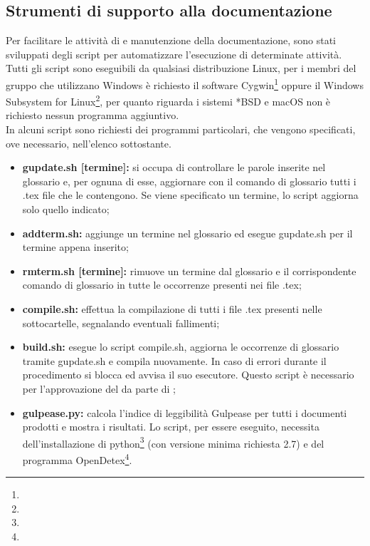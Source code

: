 \documentclass[NormeDiProgetto.tex]{subfiles}
\begin{document}
	\subsection{Strumenti di supporto alla documentazione}
	Per facilitare le attività di  e manutenzione della documentazione, sono stati sviluppati degli script per automatizzare l'esecuzione di determinate attività. \\
	Tutti gli script sono eseguibili da qualsiasi distribuzione Linux, per i membri del gruppo che utilizzano Windows è richiesto il software Cygwin\footnote{} oppure il Windows Subsystem for Linux\footnote{}, per quanto riguarda i sistemi *BSD e macOS non è richiesto nessun programma aggiuntivo.\\
	In alcuni script sono richiesti dei programmi particolari, che vengono specificati, ove necessario, nell'elenco sottostante.
	\begin{itemize}
		\item \textbf{gupdate.sh [termine]:} si occupa di controllare le parole inserite nel glossario e, per ognuna di esse, aggiornare con il comando di glossario tutti i .tex file che le contengono. Se viene specificato un termine, lo script aggiorna solo quello indicato;
		\item \textbf{addterm.sh:} aggiunge un termine nel glossario ed esegue gupdate.sh per il termine appena inserito;
		\item \textbf{rmterm.sh [termine]:} rimuove un termine dal glossario e il corrispondente comando di glossario in tutte le occorrenze presenti nei file .tex;
		\item \textbf{compile.sh:} effettua la compilazione di tutti i file .tex presenti nelle sottocartelle, segnalando eventuali fallimenti;
		\item \textbf{build.sh:} esegue lo script compile.sh, aggiorna le occorrenze di glossario tramite gupdate.sh e compila nuovamente. In caso di errori durante il procedimento si blocca ed avvisa il suo esecutore. Questo script è necessario per l'approvazione del  da parte di ;
		\item \textbf{gulpease.py:} calcola l'indice di leggibilità Gulpease per tutti i documenti prodotti e mostra i risultati. Lo script, per essere eseguito, necessita dell'installazione di python\footnote{} (con versione minima richiesta 2.7) e del programma OpenDetex\footnote{}.	
	\end{itemize}
	
\end{document}
